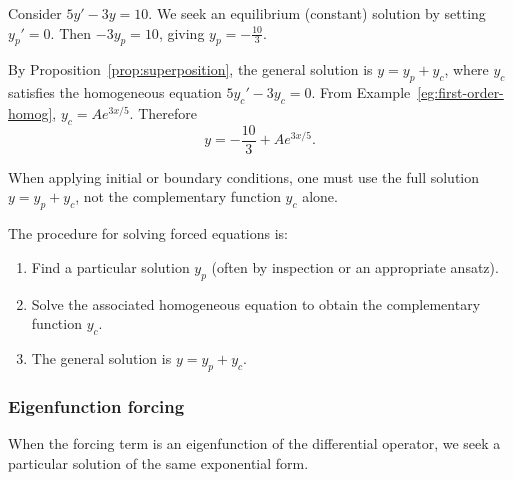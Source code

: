 \documentclass[a4paper]{article}
\begin{document}
\begin{eg}
  Consider $5y' - 3y = 10$. We seek an equilibrium (constant) solution by setting $y_p' = 0$. Then $-3y_p = 10$, giving $y_p = -\frac{10}{3}$.

  By Proposition~\ref{prop:superposition}, the general solution is $y = y_p + y_c$, where $y_c$ satisfies the homogeneous equation $5y_c' - 3y_c = 0$. From Example~\ref{eg:first-order-homog}, $y_c = Ae^{3x/5}$. Therefore
  \[
    y = -\frac{10}{3} + Ae^{3x/5}.
  \]
\end{eg}

\begin{remark}
  When applying initial or boundary conditions, one must use the full solution $y = y_p + y_c$, not the complementary function $y_c$ alone.
\end{remark}

\begin{remark}
  The procedure for solving forced equations is:
  \begin{enumerate}
    \item Find a particular solution $y_p$ (often by inspection or an appropriate ansatz).
    \item Solve the associated homogeneous equation to obtain the complementary function $y_c$.
    \item The general solution is $y = y_p + y_c$.
  \end{enumerate}
\end{remark}

\subsubsection{Eigenfunction forcing}

\begin{remark}
  When the forcing term is an eigenfunction of the differential operator, we seek a particular solution of the same exponential form.
\end{remark}
\end{document}
